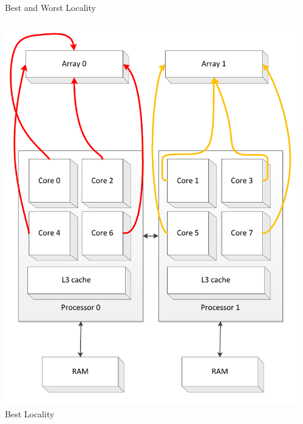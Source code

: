\begin{frame}{Best and Worst Locality}
  \begin{columns}[c]
    \begin{column}{0.50\textwidth}
      \begin{center}
        \includegraphics[width=\textwidth]{figures/cache-stress-test-mafushi-best} \\
        \tiny{Best Locality}     
      \end{center}
    \end{column}
    \begin{column}{0.50\textwidth}
      \begin{center}

\end{center}
\end{column}
\end{columns}
\end{frame}
